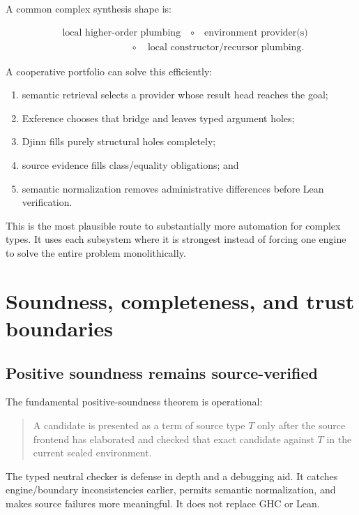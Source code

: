 \documentclass[11pt]{article}
\newcommand{\Djinn}{Djinn}
\newcommand{\Exference}{Exference}
\begin{document}
A common complex synthesis shape is:

\[
\begin{aligned}
&\text{local higher-order plumbing}
  \quad\circ\quad \text{environment provider(s)}\\
&\hspace{7em}\circ\quad
  \text{local constructor/recursor plumbing}.
\end{aligned}
\]

A cooperative portfolio can solve this efficiently:

\begin{enumerate}
  \item semantic retrieval selects a provider whose result head reaches the
    goal;
  \item \Exference{} chooses that bridge and leaves typed argument holes;
  \item \Djinn{} fills purely structural holes completely;
  \item source evidence fills class/equality obligations; and
  \item semantic normalization removes administrative differences before Lean
    verification.
\end{enumerate}

This is the most plausible route to substantially more automation for complex
types.  It uses each subsystem where it is strongest instead of forcing one
engine to solve the entire problem monolithically.

\section{Soundness, completeness, and trust boundaries}
\label{sec:soundness}

\subsection{Positive soundness remains source-verified}

The fundamental positive-soundness theorem is operational:

\begin{quote}
A candidate is presented as a term of source type \(T\) only after the source
frontend has elaborated and checked that exact candidate against \(T\) in the
current sealed environment.
\end{quote}

The typed neutral checker is defense in depth and a debugging aid.  It catches
engine/boundary inconsistencies earlier, permits semantic normalization, and
makes source failures more meaningful.  It does not replace GHC or Lean.
\end{document}
